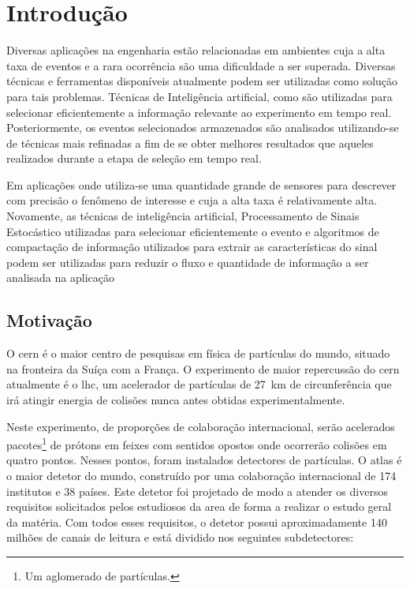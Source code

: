 \chapter{Introdução}
\label{cap:intro}
\glsresetall

Diversas aplicações na engenharia estão relacionadas em ambientes cuja a alta taxa
de eventos e a rara ocorrência são uma dificuldade a ser superada. Diversas técnicas
e ferramentas  disponíveis  atualmente podem ser utilizadas como solução para tais
problemas. Técnicas de Inteligência artificial, como  são utilizadas para 
selecionar eficientemente a informação relevante ao experimento em tempo real. 
Posteriormente, os eventos selecionados armazenados são analisados utilizando-se 
de técnicas mais refinadas a fim de se obter melhores resultados que aqueles realizados 
durante a etapa de seleção em tempo real.

Em aplicações onde utiliza-se uma quantidade grande de sensores para descrever
com precisão o fenômeno de interesse e cuja a alta taxa é relativamente alta. Novamente,
as técnicas de inteligência artificial, Processamento de Sinais Estocástico utilizadas para selecionar
eficientemente o evento e algoritmos de compactação de informação utilizados para
extrair as características  do sinal podem ser utilizadas para reduzir o fluxo e quantidade
de informação a ser analisada na aplicação

\section{Motivação}

O \gls{cern} é o maior centro de pesquisas em física de partículas do mundo, situado na  fronteira da Suíça com 
a França. O experimento de maior repercussão do \gls{cern} atualmente é o \gls{lhc}, um acelerador de partículas 
de 27~km de circunferência que irá atingir energia de colisões nunca antes obtidas experimentalmente. 

Neste experimento, de proporções de colaboração internacional, serão acelerados pacotes\footnote{Um aglomerado de partículas.}
de prótons em feixes com sentidos opostos onde ocorrerão colisões em quatro pontos. Nesses pontos, foram instalados 
detectores de partículas. O \gls{atlas}  é o maior detetor do mundo, construído por uma colaboração internacional de 
174 institutos e 38 países. Este detetor foi projetado de modo a atender os diversos requisitos solicitados pelos
estudiosos da area de forma a realizar o estudo geral da matéria. Com todos esses requisitos, o detetor possui aproximadamente 
140 milhões de canais de leitura e está dividido nos seguintes subdetectores:

